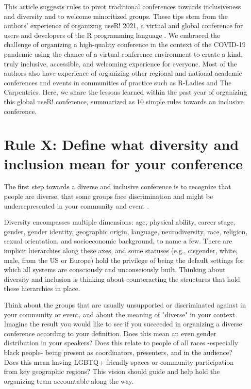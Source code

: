\documentclass[10pt,letterpaper]{article}
\begin{document}
This article suggests rules to pivot traditional conferences towards inclusiveness and diversity and to welcome minoritized groups. These tips stem from the authors' experience of organizing useR! 2021, a virtual and global conference for users and developers of the R programming language \cite{r_core_team_2021}. We embraced the challenge of organizing a high-quality conference in the context of the COVID-19 pandemic using the chance of a virtual conference environment to create a kind, truly inclusive, accessible, and welcoming experience for everyone. Most of the authors also have experience of organizing other regional and national academic conferences and events in communities of practice such as R-Ladies and The Carpentries. Here, we share the lessons learned within the past year of organizing this global useR! conference, summarized as 10 simple rules towards an inclusive conference.

\section{Rule X: Define what diversity and inclusion mean for your conference}
%
The first step towards a diverse and inclusive conference is to recognize that people are diverse, that some groups face discrimination and might be underrepresented in your community and event \cite{timperley_he_2020}. 


Diversity encompasses multiple dimensions: age, physical ability, career stage, gender, gender identity,  geographic origin, language, neurodiversity, race, religion, sexual orientation, and socioeconomic background, to name a few. There are implicit hierarchies along these axes, and some statuses (e.g., cisgender, white, male, from the US or Europe) hold the privilege of being the default settings for which all systems are consciously and unconsciously built. Thinking about diversity and inclusion is thinking about counteracting the structures that hold these hierarchies in place.


Think about the groups that are usually unsupported or discriminated against in your community or event, and about the meaning of "diverse" in your context. Imagine the result you would like to see if you succeeded in organizing a diverse conference according to your definition. Does this mean an even gender distribution in your speakers? Does this relate to people of all races -especially black people- being present as coordinators, presenters, and in the audience? Does this mean having LGBTQ+ friendly-spaces or community participation from key geographic regions? This vision should guide and help hold the organizing team accountable along the way.
\end{document}

